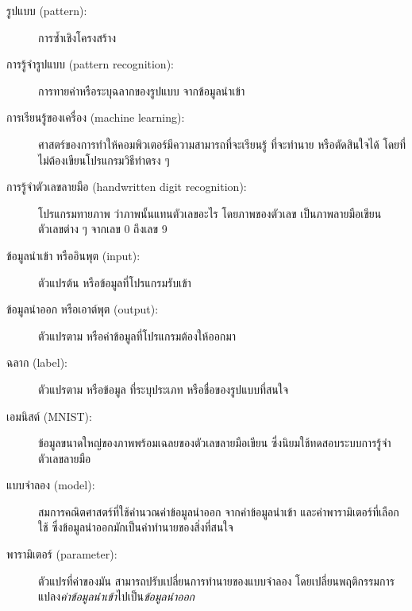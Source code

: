 \begin{description}
	
	\item[รูปแบบ (pattern):] การซ้ำเชิงโครงสร้าง

	\item[การรู้จำรูปแบบ (pattern recognition):] 
	การทายค่าหรือระบุฉลากของรูปแบบ จากข้อมูลนำเข้า
	
	\item[การเรียนรู้ของเครื่อง (machine learning):] ศาสตร์ของการทำให้คอมพิวเตอร์มีความสามารถที่จะเรียนรู้ 
	ที่จะทำนาย หรือตัดสินใจได้ โดยที่ไม่ต้องเขียนโปรแกรมวิธีทำตรง ๆ

    \item[การรู้จำตัวเลขลายมือ (handwritten digit recognition):]
โปรแกรมทายภาพ ว่าภาพนั้นแทนตัวเลขอะไร
โดยภาพของตัวเลข เป็นภาพลายมือเขียนตัวเลขต่าง ๆ จากเลข 0 ถึงเลข 9    

    \item[ข้อมูลนำเข้า หรืออินพุต (input):]
ตัวแปรต้น หรือข้อมูลที่โปรแกรมรับเข้า


    \item[ข้อมูลนำออก หรือเอาต์พุต (output):]
ตัวแปรตาม หรือค่าข้อมูลที่โปรแกรมต้องให้ออกมา

    \item[ฉลาก (label):]
ตัวแปรตาม หรือข้อมูล ที่ระบุประเภท หรือชื่อของรูปแบบที่สนใจ

	\item[เอมนิสต์ (MNIST):]
ข้อมูลขนาดใหญ่ของภาพพร้อมเฉลยของตัวเลขลายมือเขียน ซึ่งนิยมใช้ทดสอบระบบการรู้จำตัวเลขลายมือ

	\item[แบบจำลอง (model):] สมการคณิตศาสตร์ที่ใช้คำนวณค่าข้อมูลนำออก จากค่าข้อมูลนำเข้า
	และค่าพารามิเตอร์ที่เลือกใช้ ซึ่งข้อมูลนำออกมักเป็นค่าทำนายของสิ่งที่สนใจ  


	\item[พารามิเตอร์ (parameter):]
	ตัวแปรที่ค่าของมัน สามารถปรับเปลี่ยนการทำนายของแบบจำลอง โดยเปลี่ยนพฤติกรรมการแปลง\textit{ค่าข้อมูลนำเข้า}ไปเป็น\textit{ข้อมูลนำออก}
	

\end{description}

